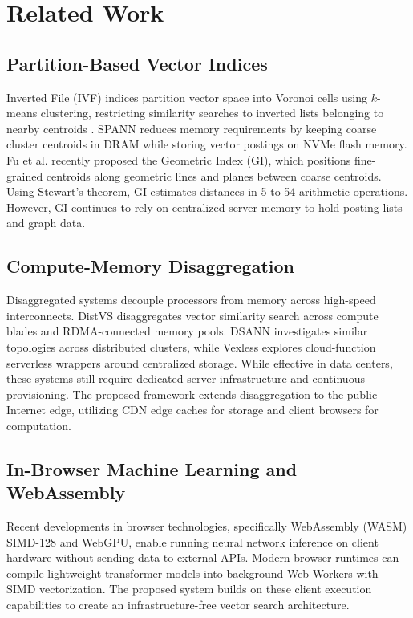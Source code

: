 \documentclass[11pt,journal,compsoc,onecolumn]{IEEEtran}
\begin{document}
\clearpage

\section{Related Work}
\subsection{Partition-Based Vector Indices}
Inverted File (IVF) indices partition vector space into Voronoi cells using $k$-means clustering, restricting similarity searches to inverted lists belonging to nearby centroids \cite{jegou2011product, johnson2021billion}. SPANN \cite{chen2021spann} reduces memory requirements by keeping coarse cluster centroids in DRAM while storing vector postings on NVMe flash memory. Fu et al. \cite{fu2026geometric} recently proposed the Geometric Index (GI), which positions fine-grained centroids along geometric lines and planes between coarse centroids. Using Stewart's theorem, GI estimates distances in 5 to 54 arithmetic operations. However, GI continues to rely on centralized server memory to hold posting lists and graph data.

\subsection{Compute-Memory Disaggregation}
Disaggregated systems decouple processors from memory across high-speed interconnects. DistVS \cite{zhang2023distvs} disaggregates vector similarity search across compute blades and RDMA-connected memory pools. DSANN investigates similar topologies across distributed clusters, while Vexless \cite{vexless2024} explores cloud-function serverless wrappers around centralized storage. While effective in data centers, these systems still require dedicated server infrastructure and continuous provisioning. The proposed framework extends disaggregation to the public Internet edge, utilizing CDN edge caches for storage and client browsers for computation.

\subsection{In-Browser Machine Learning and WebAssembly}
Recent developments in browser technologies, specifically WebAssembly (WASM) SIMD-128 and WebGPU, enable running neural network inference on client hardware without sending data to external APIs. Modern browser runtimes can compile lightweight transformer models into background Web Workers with SIMD vectorization. The proposed system builds on these client execution capabilities to create an infrastructure-free vector search architecture.
\end{document}
